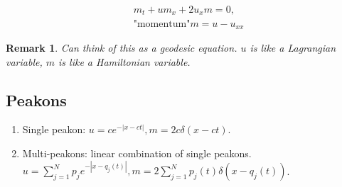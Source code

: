 \documentclass[12pt,reqno]{amsart}
\numberwithin{equation}{section}  %
\newtheorem{remark}[theorem]{Remark}
\begin{document}
        \begin{equation*}
        \begin{split}
          & m_{t} + um_{x} + 2 u_{x}m =0,
          \\
          & \text{"momentum"} m = u - u_{xx}
        \end{split}
        \end{equation*}
        \begin{remark}
        Can think of this as a geodesic equation. $u$ is like a Lagrangian
        variable, $m$ is like a Hamiltonian variable.
        \end{remark}


        \subsection{Peakons} 
        \label{ssec:peakons}
        \begin{enumerate}
          \item Single peakon: $u = ce^{-| x -ct |}, m = 2 c \delta(x -ct)$.
          \item Multi-peakons: linear combination of single peakons. $u =
            \sum_{j=1}^{N} p_{j}e^{-| x - q_{j}(t) |}, m = 2 \sum_{j
            =1}^{N} p_{j}(t) \delta(x - q_{j}(t))$.
    \end{enumerate}
\end{document}
